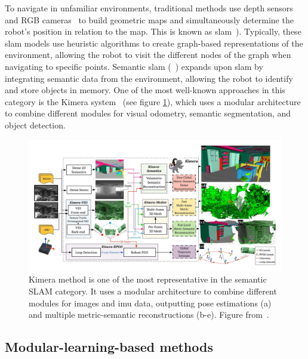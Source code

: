 To navigate in unfamiliar environments, traditional methods use depth sensors~\cite{newcombe2011, thrun2001} and RGB cameras~\cite{jones2011, sattler2018} to build geometric maps and simultaneously determine the robot's position in relation to the map.
This is known as \acrfull{slam}~\cite{Kazerouni2022, campos2021, labbe2022}).
Typically, these \acrshort{slam} models use heuristic algorithms to create graph-based representations of the environment, allowing the robot to visit the different nodes of the graph when navigating to specific points.
Semantic \acrshort{slam} (\eg~\cite{zhang2018, jin2023}) expands upon \acrshort{slam} by integrating semantic data from the environment, allowing the robot to identify and store objects in memory.
One of the most well-known approaches in this category is the Kimera system~\cite{rosinol2020} (see figure \ref{fig:kimera-chart}), which uses a modular architecture to combine different modules for visual odometry, semantic segmentation, and object detection.

\begin{figure}
    \centering
    \includegraphics[width=\textwidth]{figures/related_work/kimera_chart_25 Large}
    \caption{Kimera method is one of the most representative in the semantic SLAM category.
    It uses a modular architecture to combine different modules for images and \acrfull{imu} data, outputting pose estimations (a) and multiple metric-semantic reconstructions (b-e).
    Figure from~\cite{rosinol2020}.}
    \label{fig:kimera-chart}
\end{figure}

\subsection{Modular-learning-based methods}\label{subsec:modular-learning-based-methods}


